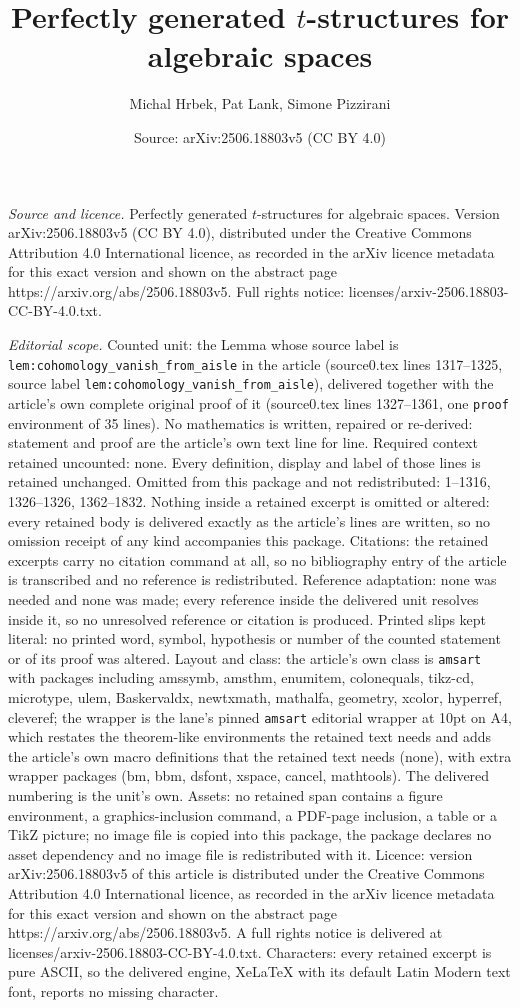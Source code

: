 \documentclass[10pt,a4paper]{amsart}
\title[Perfectly generated $t$-structures for algebraic spaces]{Perfectly generated $t$-structures for algebraic spaces}
\author{Michal Hrbek, Pat Lank, Simone Pizzirani}
\date{Source: arXiv:2506.18803v5 (CC BY 4.0)}
\begin{document}
\maketitle

\noindent\emph{Source and licence.} Perfectly generated $t$-structures for algebraic spaces. Version arXiv:2506.18803v5 (CC BY 4.0), distributed under the Creative Commons Attribution 4.0 International licence, as recorded in the arXiv licence metadata for this exact version and shown on the abstract page https://arxiv.org/abs/2506.18803v5. Full rights notice: licenses/arxiv-2506.18803-CC-BY-4.0.txt.\par\smallskip

\noindent\textit{Editorial scope.} Counted unit: the Lemma whose source label is \texttt{lem:cohomology\_vanish\_from\_aisle} in the article (source0.tex lines 1317--1325, source label \texttt{lem:cohomology\_vanish\_from\_aisle}), delivered together with the article's own complete original proof of it (source0.tex lines 1327--1361, one \texttt{proof} environment of 35 lines). No mathematics is written, repaired or re-derived: statement and proof are the article's own text line for line. Required context retained uncounted: none. Every definition, display and label of those lines is retained unchanged. Omitted from this package and not redistributed: 1--1316, 1326--1326, 1362--1832. Nothing inside a retained excerpt is omitted or altered: every retained body is delivered exactly as the article's lines are written, so no omission receipt of any kind accompanies this package. Citations: the retained excerpts carry no citation command at all, so no bibliography entry of the article is transcribed and no reference is redistributed. Reference adaptation: none was needed and none was made; every reference inside the delivered unit resolves inside it, so no unresolved reference or citation is produced. Printed slips kept literal: no printed word, symbol, hypothesis or number of the counted statement or of its proof was altered. Layout and class: the article's own class is \texttt{amsart} with packages including amssymb, amsthm, enumitem, colonequals, tikz-cd, microtype, ulem, Baskervaldx, newtxmath, mathalfa, geometry, xcolor, hyperref, cleveref; the wrapper is the lane's pinned \texttt{amsart} editorial wrapper at 10pt on A4, which restates the theorem-like environments the retained text needs and adds the article's own macro definitions that the retained text needs (none), with extra wrapper packages (bm, bbm, dsfont, xspace, cancel, mathtools). The delivered numbering is the unit's own. Assets: no retained span contains a figure environment, a graphics-inclusion command, a PDF-page inclusion, a table or a TikZ picture; no image file is copied into this package, the package declares no asset dependency and no image file is redistributed with it. Licence: version arXiv:2506.18803v5 of this article is distributed under the Creative Commons Attribution 4.0 International licence, as recorded in the arXiv licence metadata for this exact version and shown on the abstract page https://arxiv.org/abs/2506.18803v5. A full rights notice is delivered at licenses/arxiv-2506.18803-CC-BY-4.0.txt. Characters: every retained excerpt is pure ASCII, so the delivered engine, XeLaTeX with its default Latin Modern text font, reports no missing character.
\end{document}
